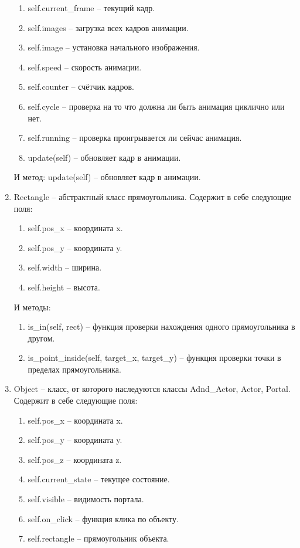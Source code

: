 \begin{enumerate}
\begin{enumerate}
			\item self.current\_frame -- текущий кадр.
			\item self.images  -- загрузка всех кадров анимации.
			\item self.image -- установка начального изображения.
			\item self.speed -- скорость анимации.
			\item self.counter -- счётчик кадров.
			\item self.cycle -- проверка на то что должна ли быть анимация циклично или нет.
			\item self.running -- проверка проигрывается ли сейчас анимация.
			\item update(self) -- обновляет кадр в анимации.
		\end{enumerate}
		И метод: update(self) -- обновляет кадр в анимации.
	\item Rectangle -- абстрактный класс прямоугольника. Содержит в себе следующие поля:
		\begin{enumerate}
			\item self.pos\_x -- координата x.
			\item self.pos\_y -- координата y.
			\item self.width -- ширина.
			\item self.height -- высота.
		\end{enumerate}
		И методы:
		\begin{enumerate}
			\item is\_in(self, rect) -- функция проверки нахождения одного прямоугольника в другом.
			\item is\_point\_inside(self, target\_x, target\_y) -- функция проверки точки в пределах прямоугольника.
		\end{enumerate}
	\item Object -- класс, от которого наследуются классы Adnd\_Actor, Actor, Portal. Содержит в себе следующие поля:
		\begin{enumerate}
			\item self.pos\_x -- координата x.
			\item self.pos\_y -- координата y.
			\item self.pos\_z -- координата z.
			\item self.current\_state -- текущее состояние.
			\item self.visible -- видимость портала.
			\item self.on\_click -- функция клика по объекту.
			\item self.rectangle -- прямоугольник объекта.

\end{enumerate}
\end{enumerate}

